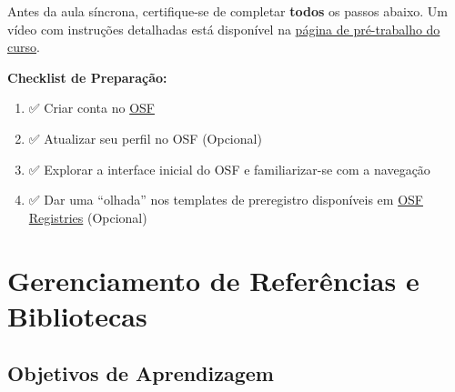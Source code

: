\documentclass[
  a4paper,
]{book}
\providecommand{\tightlist}{%
  \setlength{\itemsep}{0pt}\setlength{\parskip}{0pt}}\usepackage{longtable,booktabs,array}
\newcommand{\emojitext}[1]{{\emoji #1}}
\begin{document}
\begin{tcolorbox}[enhanced jigsaw, colback=white, toptitle=1mm, opacityback=0, left=2mm, rightrule=.15mm, title=\textcolor{quarto-callout-important-color}{\faExclamation}\hspace{0.5em}{Pré-requisitos}, coltitle=black, opacitybacktitle=0.6, breakable, toprule=.15mm, bottomtitle=1mm, titlerule=0mm, bottomrule=.15mm, arc=.35mm, leftrule=.75mm, colframe=quarto-callout-important-color-frame, colbacktitle=quarto-callout-important-color!10!white]

Antes da aula síncrona, certifique-se de completar \textbf{todos} os
passos abaixo. Um vídeo com instruções detalhadas está disponível na
\hyperref[sec-osfprework]{página de pré-trabalho do curso}.

\vspace{10pt}

\textbf{Checklist de Preparação:}

\vspace{10pt}

\begin{enumerate}
\def\labelenumi{\arabic{enumi}.}
\tightlist
\item
  \emojitext{✅} Criar conta no \href{https://osf.io/register}{OSF}
\item
  \emojitext{✅} Atualizar seu perfil no OSF (Opcional)
\item
  \emojitext{✅} Explorar a interface inicial do OSF e familiarizar-se
  com a navegação
\item
  \emojitext{✅} Dar uma ``olhada'' nos templates de preregistro
  disponíveis em
  \href{https://help.osf.io/article/330-welcome-to-registrations\#Select-a-Registration-Template-1g4YO}{OSF
  Registries} (Opcional)
\end{enumerate}

\end{tcolorbox}


\chapter{Gerenciamento de Referências e Bibliotecas}\label{sec-zotero}

\section{Objetivos de Aprendizagem}\label{objetivos-de-aprendizagem-2}
\end{document}
